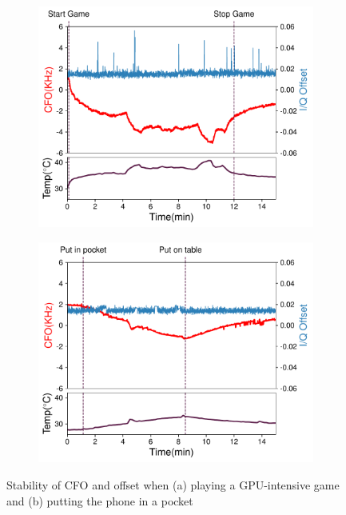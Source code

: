 \begin{figure}
\begin{subfigure}{0.48\textwidth}
    \includegraphics[width = \textwidth]{bletracking/plots/gameplay_temp_cfoiq.pdf} 
    \caption{}
\end{subfigure}
\hfill
\begin{subfigure}{0.48\textwidth}
    \includegraphics[width = \textwidth]{bletracking/plots/idle_temp_cfoiq.pdf} 
    \caption{}
\end{subfigure}
\captionsetup{justification=centering}
\caption{Stability of CFO and \iq offset when (a) playing a GPU-intensive game and (b) putting the phone in a pocket}
\label{fig:stability_cfo_temp}
\end{figure}

